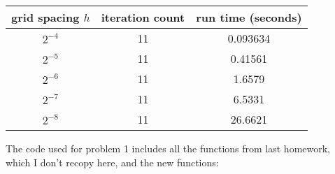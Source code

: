 \documentclass[12pt]{article}
\begin{document}
\begin{center}
\begin{tabular}{||c|c|c||}
\hline \hline
   grid spacing $h$ &   iteration count &   run time (seconds) \\
\hline \hline
       $2^{-4}$      &                11 &             0.093634 \\
       $2^{-5}$    &                11 &             0.41561  \\
       $2^{-6}$    &                11 &             1.6579   \\
       $2^{-7}$   &                11 &             6.5331   \\
       $2^{-8}$  &                11 &            26.6621   \\
\hline \hline
\end{tabular}
\end{center}
The code used for problem 1 includes all the functions from last homework, which I don't recopy here, and the new functions:
\end{document}
